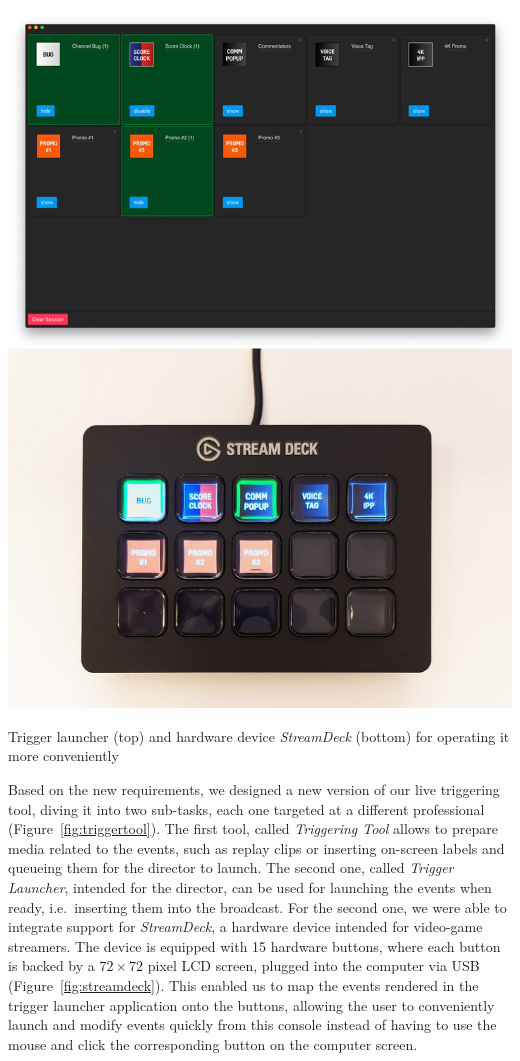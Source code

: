 \documentclass[sigchi-a, authorversion]{acmart}
\begin{document}
\begin{marginfigure}
    \includegraphics[width=\marginparwidth-10pt]{Figures/streamdeck.jpg}
    \caption{Trigger launcher (top) and hardware device \emph{StreamDeck} (bottom) for operating it more conveniently}
    \label{fig:streamdeck}
\end{marginfigure}

Based on the new requirements, we designed a new version of our live triggering
tool, diving it into two sub-tasks, each one targeted at a different professional
(Figure~\ref{fig:triggertool}). The first tool, called \emph{Triggering Tool} allows to prepare media
related to the events, such as replay clips or inserting on-screen labels and queueing
them for the director to launch. The second one, called \emph{Trigger Launcher}, intended for the director, can
be used for launching the events when ready, i.e.\ inserting them into the broadcast.
For the second one, we were able to integrate support for \emph{StreamDeck}, a
hardware device intended for video-game streamers. The device is equipped with 15
hardware buttons, where each button is backed by a $72\times72$ pixel LCD screen, plugged into the computer via USB
(Figure~\ref{fig:streamdeck}). This enabled us to map the events rendered in the
trigger launcher application onto the buttons, allowing the user to conveniently launch and
modify events quickly from this console instead of having to use the mouse and
click the corresponding button on the computer screen.
\end{document}
